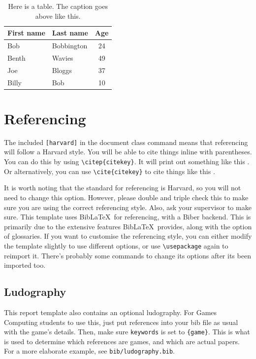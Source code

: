 \begin{table}[h]
    \caption{Here is a table. The caption goes above like this.}
    \centering
    \begin{tabular}{l|l|c}
        First name & Last name & Age \\
        \hline\hline
        Bob & Bobbington & 24 \\
        Benth & Wavies & 49 \\
        Joe & Bloggs & 37 \\
        Billy & Bob & 10 \\

    \end{tabular}
    \label{tbl:example-table}
\end{table}

\section{Referencing}
The included \texttt{[harvard]} in the document class command means that referencing will follow a Harvard style. You will be able to cite things inline with parentheses. You can do this by using \texttt{\textbackslash citep\{citekey\}}. It will print out something like this \citep{aad2012observation}. Or alternatively, you can use \texttt{\textbackslash cite\{citekey\}} to cite things like this \cite{chatrchyan2012observation}.

It is worth noting that the standard for referencing is Harvard, so you will not need to change this option. However, please double and triple check this to make sure you are using the correct referencing style. Also, ask your supervisor to make sure. This template uses Bib\LaTeX~for referencing, with a Biber backend. This is primarily due to the extensive features Bib\LaTeX~provides, along with the option of glossaries. If you want to customise the referencing style, you can either modify the template slightly to use different options, or use \texttt{\textbackslash usepackage} again to reimport it. There's probably some commands to change its options after its been imported too.

\subsection{Ludography}
This report template also contains an optional ludography. For Games Computing students to use this, just put references into your bib file as usual with the game's details. Then, make sure \texttt{keywords} is set to \texttt{\{game\}}. This is what is used to determine which references are games, and which are actual papers. For a more elaborate example, see \texttt{bib/ludography.bib}.

